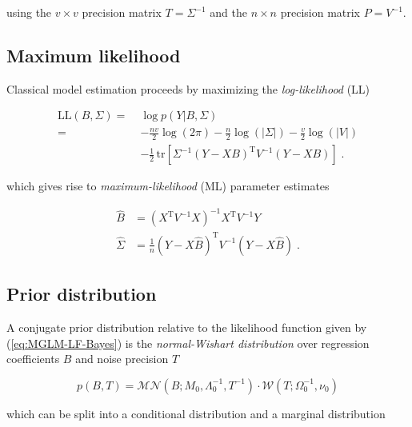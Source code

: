 using the $v \times v$ precision matrix $T = \Sigma^{-1}$ and the $n \times n$ precision matrix $P = V^{-1}$.


\subsection{Maximum likelihood} \label{sec:MGLM-MLE}

Classical model estimation proceeds by maximizing the \textit{log-likelihood} (LL)

\begin{equation} \label{eq:MGLM-LL}
\begin{split}
\mathrm{LL}(B,\Sigma) = \; &\log p(Y|B,\Sigma) \\
= \; &- \frac{nv}{2} \log(2\pi) - \frac{n}{2} \log(|\Sigma|) - \frac{v}{2} \log(|V|) \\
&- \frac{1}{2} \, \mathrm{tr}\left[ \Sigma^{-1} (Y - XB)^\mathrm{T} V^{-1} (Y - XB) \right] \; .
\end{split}
\end{equation}

which gives rise to \textit{maximum-likelihood} (ML) parameter estimates

\vspace{-0.5em}
\begin{equation} \label{eq:MGLM-MLE}
\begin{split}
\hat{B} &= (X^\mathrm{T} V^{-1} X)^{-1} X^\mathrm{T} V^{-1} Y \\
\hat{\Sigma} &= \frac{1}{n} (Y - X\hat{B})^\mathrm{T} V^{-1} (Y - X\hat{B}) \; .
\end{split}
\end{equation}


\subsection{Prior distribution} \label{sec:MGLM-NW-prior}

A conjugate prior distribution relative to the likelihood function given by (\ref{eq:MGLM-LF-Bayes}) is the \textit{normal-Wishart distribution} over regression coefficients $B$ and noise precision $T$

\begin{equation} \label{eq:MGLM-NW-prior}
p(B,T) = \mathcal{MN}(B; M_0, \Lambda_0^{-1}, T^{-1}) \cdot \mathcal{W}(T; \Omega_0^{-1}, \nu_0)
\end{equation}

which can be split into a conditional distribution and a marginal distribution

